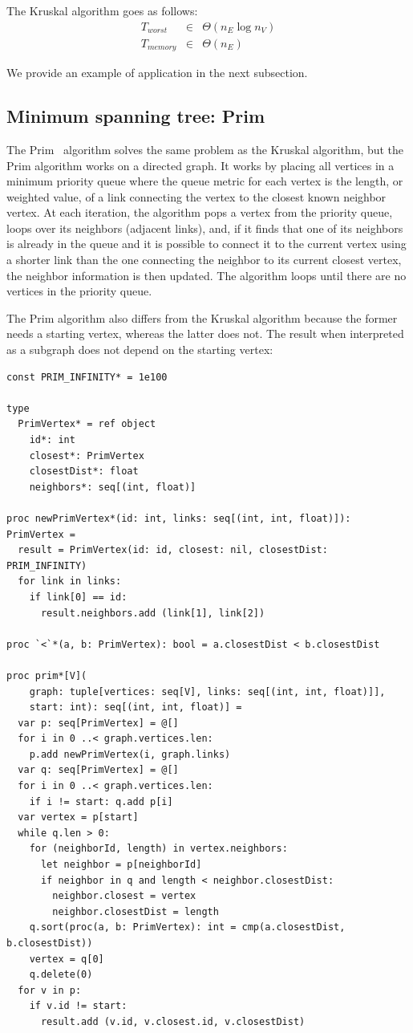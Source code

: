 \documentclass[justified, sixbynine]{tufte-book}
\def\ft{\small\tt}
\theoremstyle{plain}%
\newtheorem * {corollary}{Corollary}
\theoremstyle{definition}
\theoremstyle{remark}
\newtheorem * {remark}{Remark}
\newtheorem * {note}{Note}
\begin{document}
\begin{fullwidth}
The Kruskal algorithm goes as follows:
\begin{eqnarray}
T_{worst} &\in &\Theta (n_E\log n_V) \\
T_{memory} &\in &\Theta (n_E)
\end{eqnarray}

We provide an example of application in the next subsection.

\goodbreak\subsection{Minimum spanning tree: Prim}

The Prim~\cite{prim} algorithm solves the same problem as the Kruskal algorithm, but the Prim algorithm works on a directed graph. It works by placing all vertices in a minimum priority queue where the queue metric for each vertex is the length, or weighted value, of a link connecting the vertex to the closest known neighbor vertex. At each iteration, the algorithm pops a vertex from the priority queue, loops over its neighbors (adjacent links), and, if it finds that one of its neighbors is already in the queue and it is possible to connect it to the current vertex using a shorter link than the one connecting the neighbor to its current closest vertex, the neighbor information is then updated. The algorithm loops until there are no vertices in the priority queue.

The Prim algorithm also differs from the Kruskal algorithm because the former needs a starting vertex, whereas the latter does not. The result when interpreted as a subgraph does not depend on the starting vertex:

\begin{lstlisting}[caption={in file: {\ft nlib.nim}}]
const PRIM_INFINITY* = 1e100

type
  PrimVertex* = ref object
    id*: int
    closest*: PrimVertex
    closestDist*: float
    neighbors*: seq[(int, float)]

proc newPrimVertex*(id: int, links: seq[(int, int, float)]): PrimVertex =
  result = PrimVertex(id: id, closest: nil, closestDist: PRIM_INFINITY)
  for link in links:
    if link[0] == id:
      result.neighbors.add (link[1], link[2])

proc `<`*(a, b: PrimVertex): bool = a.closestDist < b.closestDist

proc prim*[V](
    graph: tuple[vertices: seq[V], links: seq[(int, int, float)]],
    start: int): seq[(int, int, float)] =
  var p: seq[PrimVertex] = @[]
  for i in 0 ..< graph.vertices.len:
    p.add newPrimVertex(i, graph.links)
  var q: seq[PrimVertex] = @[]
  for i in 0 ..< graph.vertices.len:
    if i != start: q.add p[i]
  var vertex = p[start]
  while q.len > 0:
    for (neighborId, length) in vertex.neighbors:
      let neighbor = p[neighborId]
      if neighbor in q and length < neighbor.closestDist:
        neighbor.closest = vertex
        neighbor.closestDist = length
    q.sort(proc(a, b: PrimVertex): int = cmp(a.closestDist, b.closestDist))
    vertex = q[0]
    q.delete(0)
  for v in p:
    if v.id != start:
      result.add (v.id, v.closest.id, v.closestDist)
\end{lstlisting}


\end{fullwidth}
\end{document}
